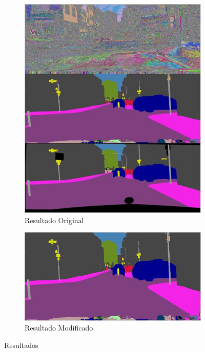 \begin{figure}[H]
\centering
  \begin{subfigure}[b]{0.45\linewidth}
    \includegraphics[width=\linewidth]{Figuras/Imagen_Concatenada.eps}
    \caption{Resultado Original}
  \end{subfigure}
  \begin{subfigure}[b]{0.45\linewidth}
    \includegraphics[width=\linewidth]{Figuras/Imagen_Modificada.eps}
    \caption{Resultado Modificado}
  \end{subfigure}
  \caption{Resultados}
  \label{fig:img_con}
\end{figure}


